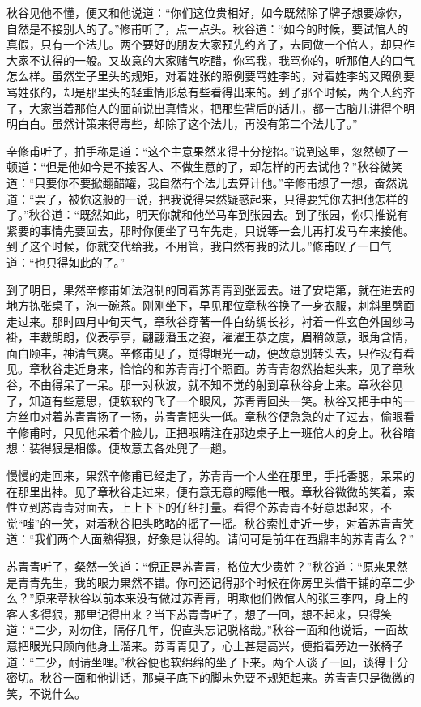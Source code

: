 \documentclass[12pt,UTF8]{ctexbook}
\begin{document}
{{{秋谷见他不懂，便又和他说道：“你们这位贵相好，如今既然除了牌子想要嫁你，自然是不接别人的了。”修甫听了，点一点头。秋谷道：“如今的时候，要试倌人的真假，只有一个法儿。两个要好的朋友大家预先约齐了，去同做一个倌人，却只作大家不认得的一般。又故意的大家赌气吃醋，你骂我，我骂你的，听那倌人的口气怎么样。虽然堂子里头的规矩，对着姓张的照例要骂姓李的，对着姓李的又照例要骂姓张的，却是那里头的轻重情形总有些看得出来的。到了那个时候，两个人约齐了，大家当着那倌人的面前说出真情来，把那些背后的话儿，都一古脑儿讲得个明明白白。虽然计策来得毒些，却除了这个法儿，再没有第二个法儿了。”

辛修甫听了，拍手称是道：“这个主意果然来得十分挖掐。”说到这里，忽然顿了一顿道：“但是他如今是不接客人、不做生意的了，却怎样的再去试他？”秋谷微笑道：“只要你不要掀翻醋罐，我自然有个法儿去算计他。”辛修甫想了一想，奋然说道：“罢了，被你这般的一说，把我说得果然疑惑起来，只得要凭你去把他怎样的了。”秋谷道：“既然如此，明天你就和他坐马车到张园去。到了张园，你只推说有紧要的事情先要回去，那时你便坐了马车先走，只说等一会儿再打发马车来接他。到了这个时候，你就交代给我，不用管，我自然有我的法儿。”修甫叹了一口气道：“也只得如此的了。”

到了明日，果然辛修甫如法泡制的同着苏青青到张园去。进了安垲第，就在进去的地方拣张桌子，泡一碗茶。刚刚坐下，早见那位章秋谷换了一身衣服，刺斜里劈面走过来。那时四月中旬天气，章秋谷穿著一件白纺绸长衫，衬着一件玄色外国纱马褂，丰裁朗朗，仪表亭亭，翩翩潘玉之姿，濯濯王恭之度，眉稍敛意，眼角含情，面白颐丰，神清气爽。辛修甫见了，觉得眼光一动，便故意别转头去，只作没有看见。章秋谷走近身来，恰恰的和苏青青打个照面。苏青青忽然抬起头来，见了章秋谷，不由得呆了一呆。那一对秋波，就不知不觉的射到章秋谷身上来。章秋谷见了，知道有些意思，便软软的飞了一个眼风，苏青青回头一笑。秋谷又把手中的一方丝巾对着苏青青扬了一扬，苏青青把头一低。章秋谷便急急的走了过去，偷眼看辛修甫时，只见他呆着个脸儿，正把眼睛注在那边桌子上一班倌人的身上。秋谷暗想：装得狠是相像。便故意去各处兜了一趟。

慢慢的走回来，果然辛修甫已经走了，苏青青一个人坐在那里，手托香腮，呆呆的在那里出神。见了章秋谷走过来，便有意无意的瞟他一眼。章秋谷微微的笑着，索性立到苏青青对面去，上上下下的仔细打量。看得个苏青青不好意思起来，不觉“嗤”的一笑，对着秋谷把头略略的摇了一摇。秋谷索性走近一步，对着苏青青笑道：“我们两个人面熟得狠，好象是认得的。请问可是前年在西鼎丰的苏青青么？”

苏青青听了，粲然一笑道：“倪正是苏青青，格位大少贵姓？”秋谷道：“原来果然是青青先生，我的眼力果然不错。你可还记得那个时候在你房里头借干铺的章二少么？”原来章秋谷以前本来没有做过苏青青，明欺他们做倌人的张三李四，身上的客人多得狠，那里记得出来？当下苏青青听了，想了一回，想不起来，只得笑道：“二少，对勿住，隔仔几年，倪直头忘记脱格哉。”秋谷一面和他说话，一面故意把眼光只顾向他身上溜来。苏青青见了，心上甚是高兴，便指着旁边一张椅子道：“二少，耐请坐哩。”秋谷便也软绵绵的坐了下来。两个人谈了一回，谈得十分密切。秋谷一面和他讲话，那桌子底下的脚未免要不规矩起来。苏青青只是微微的笑，不说什么。

}}}
\end{document}
